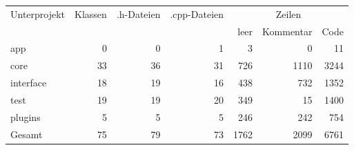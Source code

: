 \begin{tabular}{l|r|r|r|r|r|r}

Unterprojekt & Klassen & .h-Dateien & .cpp-Dateien & \multicolumn{3}{|c}{Zeilen} \\
 & & & & leer & Kommentar & Code \\
\hline
app			& 0		& 0		& 1		& 3		& 0 	& 11	\\
core		& 33	& 36	& 31 	& 726	& 1110	& 3244	\\
interface	& 18	& 19	& 16	& 438	& 732	& 1352	\\
test		& 19	& 19	& 20	& 349	& 15	& 1400	\\
plugins		& 5		& 5		& 5		& 246	& 242	& 754	\\
\hline
Gesamt 		& 75 	& 79  	& 73 	& 1762  & 2099  & 6761 	\\
\end{tabular}
